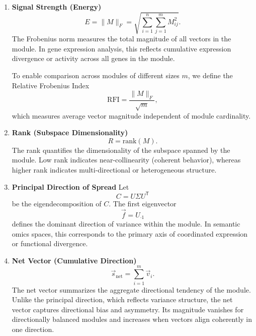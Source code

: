         \begin{enumerate}

            \item \textbf{Signal Strength (Energy)}  
                  \[
                      E = \|M\|_{F}
                      = \sqrt{\sum_{i=1}^{n}\sum_{j=1}^{m} M_{ij}^{2}}.
                  \]
                  The Frobenius norm measures the total magnitude of all vectors in the module.
                  In gene expression analysis, this reflects cumulative expression divergence or
                  activity across all genes in the module.

                  To enable comparison across modules of different sizes \(m\), we define the
                  Relative Frobenius Index
                  \[
                      \mathrm{RFI} = \frac{\|M\|_F}{\sqrt{m}},
                  \]
                  which measures average vector magnitude independent of module cardinality.

            \item \textbf{Rank (Subspace Dimensionality)}  
                  \[
                      R = \mathrm{rank}(M).
                  \]
                  The rank quantifies the dimensionality of the subspace spanned by the module.
                  Low rank indicates near-collinearity (coherent behavior), whereas higher rank
                  indicates multi-directional or heterogeneous structure.

            \item \textbf{Principal Direction of Spread}  
                  Let
                  \[
                      C = U \Sigma U^{\mathsf{T}}
                  \]
                  be the eigendecomposition of \(C\).
                  The first eigenvector
                  \[
                      \vec{f} = U_{\cdot 1}
                  \]
                  defines the dominant direction of variance within the module.
                  In semantic omics spaces, this corresponds to the primary axis of coordinated
                  expression or functional divergence.

            \item \textbf{Net Vector (Cumulative Direction)}  
                  \[
                      \vec{s}_{\mathrm{net}} = \sum_{i=1}^{m} \vec{v}_i.
                  \]
                  The net vector summarizes the aggregate directional tendency of the module.
                  Unlike the principal direction, which reflects variance structure, the net
                  vector captures directional bias and asymmetry.
                  Its magnitude vanishes for directionally balanced modules and increases when
                  vectors align coherently in one direction.


\end{enumerate}
